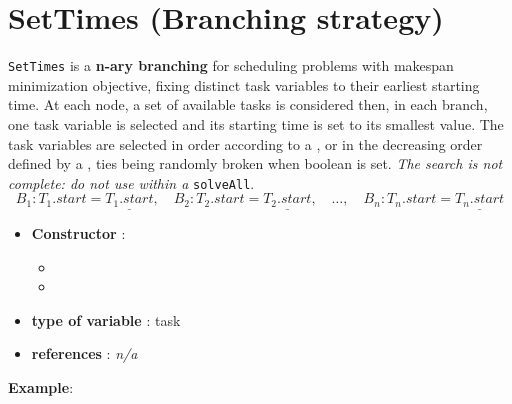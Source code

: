 \section{SetTimes (Branching strategy)}\label{settimes:settimesbranchstrat}\hypertarget{settimes:settimesbranchstrat}{}
\begin{notedef}
  \texttt{SetTimes} is a \textbf{n-ary branching} for scheduling problems with makespan minimization objective, fixing distinct task variables to their earliest starting time.
At each node, a set of available tasks is considered then, in each branch, one task variable is selected and its starting time is set to its smallest value. 
The task variables are selected in order according to a , or in the decreasing order defined by a , ties being randomly broken when boolean  is set. 
\emph{The search is not complete: do not use within a} \texttt{solveAll}. 
$$B_1: T_1.start=\underline{T_1.start},\quad B_2: T_2.start=\underline{T_2.start},\quad \ldots,\quad B_n: T_n.start=\underline{T_n.start}$$
  \end{notedef}

\begin{itemize}
	\item \textbf{Constructor} :
      \begin{itemize}
      \item {}
      \item {}
      \end{itemize}
	\item \textbf{type of variable} : task
	\item \textbf{references} : \emph{n/a}
\end{itemize}

\textbf{Example}:
%

